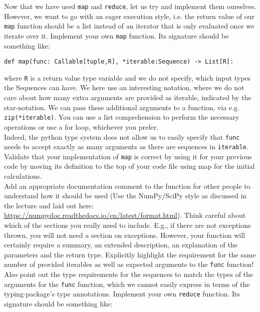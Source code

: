 \documentclass[]{erlangen-problemset}
\begin{document}
\begin{problem}[title={Building our own map and reduce functions}]
\noindent
Now that we have used \texttt{map} and \texttt{reduce}, let us try and implement them ourselves. 
However, we want to go with an eager execution style, i.e. the return value of our \texttt{map} function should be a list instead of an iterator that is only evaluated once we iterate over it.
\Question Implement your own \texttt{map} function. Its signature should be something like:
\begin{center}
	\texttt{def map(func: Callable[tuple,R], *iterable:Sequence) -> List[R]:}
\end{center}
where \texttt{R} is a return value type variable and we do not specify, which input types the Sequences can have. 
We here use an interesting notation, where we do not care about how many extra arguments are provided as iterable, indicated by the star-notation. 
We can pass these additional arguments to a function, via e.g. \texttt{zip(*iterable)}. 
You can use a list comprehension to perform the necessary operations or use a for loop, whichever you prefer.\\
Indeed, the python type system does not allow us to easily specify that \texttt{func} needs to accept exactly as many arguments as there are sequences in \texttt{iterable}.\\
Validate that your implementation of \texttt{map} is correct by using it for your previous code by moving its definition to the top of your code file using map for the initial calculations.\\
Add an appropriate documentation comment to the function for other people to understand how it should be used (Use the NumPy/SciPy style as discussed in the lecture and laid out here: \url{https://numpydoc.readthedocs.io/en/latest/format.html}). 
Think careful about which of the sections you really need to include. 
E.g., if there are not exceptions thrown, you will not need a section on exceptions. 
However, your function will certainly require a summary, an extended description, an explanation of the parameters and the return type.
Explicitly highlight the requirement for the same number of provided iterables as well as expected arguments to the \texttt{func} function! 
Also point out the type requirements for the sequences to match the types of the arguments for the \texttt{func} function, which we cannot easily express in terms of the typing-package's type annotations.
\Question Implement your own \texttt{reduce} function. Its signature should be something like:

\end{problem}
\end{document}
